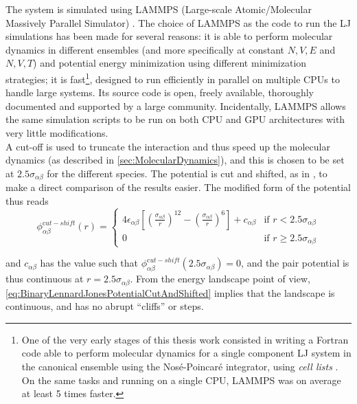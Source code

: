 The system is simulated using LAMMPS (Large-scale Atomic/Molecular Massively Parallel Simulator) \cite{plimpton1995fast}. The choice of LAMMPS as the code to run the LJ simulations has been made for several reasons: it is able to perform molecular dynamics in different ensembles (and more specifically at constant $N, V, E$ and $N, V, T$) and potential energy minimization using different minimization strategies; it is fast\footnote{One of the very early stages of this thesis work consisted in writing a Fortran code able to perform molecular dynamics for a single component LJ system in the canonical ensemble using the Nos\'e-Poincar\'e \cite{nose2001improved} integrator, using \emph{cell lists} \cite{frenkel2001understanding}. On the same tasks and running on a single CPU, LAMMPS was on average at least 5 times faster.}, designed to run efficiently in parallel on multiple CPUs to handle large systems. Its source code is open, freely available, thoroughly documented and supported by a large community. Incidentally, LAMMPS allows the same simulation scripts to be run on both CPU and GPU architectures with very little modifications. \\
A cut-off is used to truncate the interaction and thus speed up the molecular dynamics (as described in \autoref{sec:MolecularDynamics}), and this is chosen to be set at $2.5 \sigma_{\alpha \beta}$ for the different species. The potential is cut and shifted, as in \cite{lacks2004energy}, to make a direct comparison of the results easier. The modified form of the potential thus reads
\begin{equation}
	\phi^{\mathrm cut-shift}_{\alpha \beta}(r) = 
	\left\{ 
	\begin{array}{rl}
		4\epsilon_{\alpha \beta} \left[ \left( \frac{\sigma_{\alpha \beta}}{r} \right)^{12} - \left( \frac{\sigma_{\alpha \beta}}{r} \right)^{6} \right] + c_{\alpha \beta} & \text{if } r < 2.5 \sigma_{\alpha \beta}  \\
		0 & \text{if } r \geq 2.5 \sigma_{\alpha \beta}
	\end{array}
	\right.
	\label{eq:BinaryLennardJonesPotentialCutAndShifted}
\end{equation}

and $c_{\alpha \beta}$ has the value such that $\phi^{\mathrm cut-shift}_{\alpha \beta}(2.5 \sigma_{\alpha \beta}) = 0$, and the pair potential is thus continuous at $r = 2.5 \sigma_{\alpha \beta}$. From the energy landscape point of view, \autoref{eq:BinaryLennardJonesPotentialCutAndShifted} implies that the landscape is continuous, and has no abrupt ``cliffs'' or steps.

